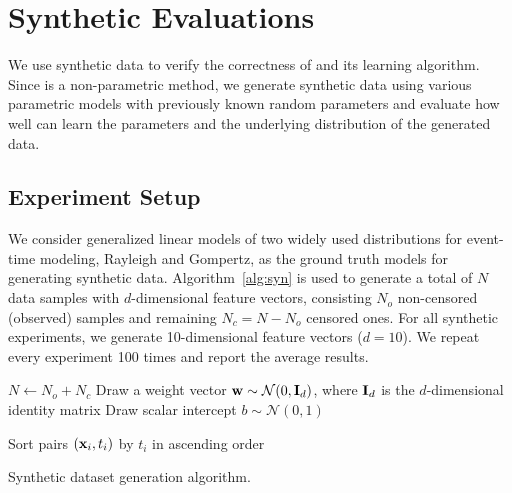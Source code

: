 \section{Synthetic Evaluations}\label{sec:synthetic}
We use synthetic data to verify the correctness of \npglm and its learning algorithm. Since \npglm is a non-parametric method, we generate synthetic data using various parametric models with previously known random parameters and evaluate how well \npglm can learn the parameters and the underlying distribution of the generated data.

\subsection{Experiment Setup}
We consider generalized linear models of two widely used distributions for event-time modeling, Rayleigh and Gompertz, as the ground truth models for generating synthetic data. Algorithm~\ref{alg:syn} is used to generate a total of $N$ data samples with $d$-dimensional feature vectors, consisting $N_o$ non-censored (observed) samples and remaining $N_c=N-N_o$ censored ones. For all synthetic experiments, we generate 10-dimensional feature vectors ($d=10$). We repeat every experiment 100 times and report the average results.

\begin{algorithm}[t]
    \small
    \SetAlgoLined
    $N\leftarrow N_o+N_c$\;
    Draw a weight vector $\mathbf{w}\sim\mathcal{N}(0,\mathbf{I}_d)$, where $\mathbf{I}_d$ is the $d$-dimensional identity matrix\;
    Draw scalar intercept $b\sim\mathcal{N}(0,1)$\;
    
    Sort pairs $(\mathbf{x}_i,t_i)$ by $t_i$ in ascending order\;
    
    \caption{Synthetic dataset generation algorithm.}
    \label{alg:syn}
\end{algorithm}


